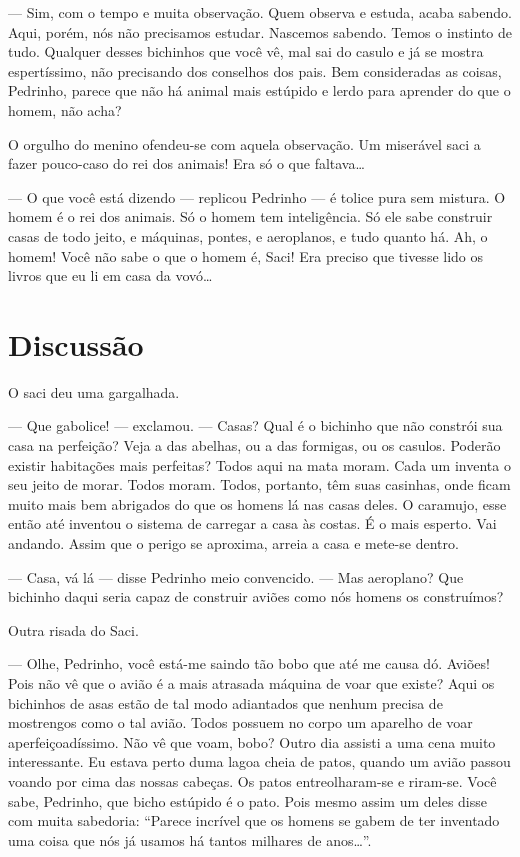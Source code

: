 --- Sim, com o tempo e muita observação. Quem observa e estuda, acaba
sabendo. Aqui, porém, nós não precisamos estudar. Nascemos sabendo.
Temos o instinto de tudo. Qualquer desses bichinhos que você vê, mal sai
do casulo e já se mostra espertíssimo, não precisando dos conselhos dos
pais. Bem consideradas as coisas, Pedrinho, parece que não há animal
mais estúpido e lerdo para aprender do que o homem, não acha?

O orgulho do menino ofendeu-se com aquela observação. Um miserável saci
a fazer pouco-caso do rei dos animais! Era só o que faltava\ldots{}

--- O que você está dizendo --- replicou Pedrinho --- é tolice pura sem
mistura. O homem é o rei dos animais. Só o homem tem inteligência. Só
ele sabe construir casas de todo jeito, e máquinas, pontes, e
aeroplanos, e tudo quanto há. Ah, o homem! Você não sabe o que o homem
é, Saci! Era preciso que tivesse lido os livros que eu li em casa da
vovó\ldots{}


\chapter{Discussão}

O saci deu uma gargalhada.

--- Que gabolice! --- exclamou. --- Casas? Qual é o bichinho que não
constrói sua casa na perfeição? Veja a das abelhas, ou a das formigas,
ou os casulos. Poderão existir habitações mais perfeitas? Todos aqui na
mata moram. Cada um inventa o seu jeito de morar. Todos moram. Todos,
portanto, têm suas casinhas, onde ficam muito mais bem abrigados do que
os homens lá nas casas deles. O caramujo, esse então até inventou o
sistema de carregar a casa às costas. É o mais esperto. Vai andando.
Assim que o perigo se aproxima, arreia a casa e mete-se dentro.

--- Casa, vá lá --- disse Pedrinho meio convencido. --- Mas aeroplano?
Que bichinho daqui seria capaz de construir aviões como nós homens os
construímos?

Outra risada do Saci.

--- Olhe, Pedrinho, você está-me saindo tão bobo que até me causa dó.
Aviões! Pois não vê que o avião é a mais atrasada máquina de voar que
existe? Aqui os bichinhos de asas estão de tal modo adiantados que
nenhum precisa de mostrengos como o tal avião. Todos possuem no corpo um
aparelho de voar aperfeiçoadíssimo. Não vê que voam, bobo? Outro dia
assisti a uma cena muito interessante. Eu estava perto duma lagoa cheia
de patos, quando um avião passou voando por cima das nossas cabeças. Os
patos entreolharam-se e riram-se. Você sabe, Pedrinho, que bicho
estúpido é o pato. Pois mesmo assim um deles disse com muita sabedoria:
``Parece incrível que os homens se gabem de ter inventado uma coisa que
nós já usamos há tantos milhares de anos\ldots{}''.

